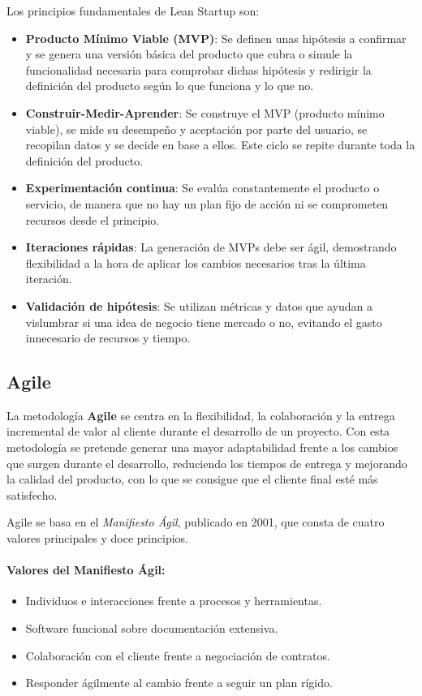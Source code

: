 Los principios fundamentales de Lean Startup son:

\begin{itemize}
  \item \textbf{Producto Mínimo Viable (MVP)}: Se definen unas hipótesis a confirmar y se genera una versión básica del producto que cubra o simule la funcionalidad necesaria para comprobar dichas hipótesis y redirigir la definición del producto según lo que funciona y lo que no.

  \item \textbf{Construir-Medir-Aprender}: Se construye el MVP (producto mínimo viable), se mide su desempeño y aceptación por parte del usuario, se recopilan datos y se decide en base a ellos. Este ciclo se repite durante toda la definición del producto.

  \item \textbf{Experimentación continua}: Se evalúa constantemente el producto o servicio, de manera que no hay un plan fijo de acción ni se comprometen recursos desde el principio.

  \item \textbf{Iteraciones rápidas}: La generación de MVPs debe ser ágil, demostrando flexibilidad a la hora de aplicar los cambios necesarios tras la última iteración.

  \item \textbf{Validación de hipótesis}: Se utilizan métricas y datos que ayudan a vislumbrar si una idea de negocio tiene mercado o no, evitando el gasto innecesario de recursos y tiempo.
\end{itemize}

\subsection{Agile}

La metodología \textbf{Agile} se centra en la flexibilidad, la colaboración y la entrega incremental de valor al cliente durante el desarrollo de un proyecto. Con esta metodología se pretende generar una mayor adaptabilidad frente a los cambios que surgen durante el desarrollo, reduciendo los tiempos de entrega y mejorando la calidad del producto, con lo que se consigue que el cliente final esté más satisfecho.

Agile se basa en el \textit{Manifiesto Ágil}, publicado en 2001, que consta de cuatro valores principales y doce principios.

\paragraph{Valores del Manifiesto Ágil:}
\begin{itemize}
    \item Individuos e interacciones frente a procesos y herramientas.
    \item Software funcional sobre documentación extensiva.
    \item Colaboración con el cliente frente a negociación de contratos.
    \item Responder ágilmente al cambio frente a seguir un plan rígido.
\end{itemize}

